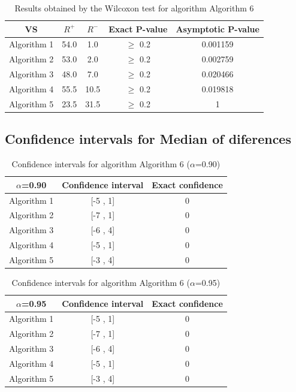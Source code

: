 \documentclass[a4paper,10pt]{article}
\begin{document}
\begin{table}[!htp]
\centering\small
\begin{tabular}{
|c|c|c|c|c|}
\hline
 VS & $R^{+}$ & $R^{-}$ & Exact P-value & Asymptotic P-value \\ \hline 
Algorithm 1 & 54.0 & 1.0 & $\geq$ 0.2 & 0.001159\\ \hline 
Algorithm 2 & 53.0 & 2.0 & $\geq$ 0.2 & 0.002759\\ \hline 
Algorithm 3 & 48.0 & 7.0 & $\geq$ 0.2 & 0.020466\\ \hline 
Algorithm 4 & 55.5 & 10.5 & $\geq$ 0.2 & 0.019818\\ \hline 
Algorithm 5 & 23.5 & 31.5 & $\geq$ 0.2 & 1\\ \hline 

\end{tabular}
\caption{Results obtained by the Wilcoxon test for algorithm Algorithm 6}
\end{table}

\subsection{Confidence intervals for Median of diferences}

\begin{table}[!htp]
\centering\small
\begin{tabular}{
|c|c|c|}
\hline
 $\alpha$=0.90 & Confidence interval & Exact confidence \\ \hline 
Algorithm 1 & [-5 , 1] & 0\\ \hline 
Algorithm 2 & [-7 , 1] & 0\\ \hline 
Algorithm 3 & [-6 , 4] & 0\\ \hline 
Algorithm 4 & [-5 , 1] & 0\\ \hline 
Algorithm 5 & [-3 , 4] & 0\\ \hline 

\end{tabular}
\caption{Confidence intervals for algorithm Algorithm 6 ($\alpha$=0.90)}
\end{table}
\begin{table}[!htp]
\centering\small
\begin{tabular}{
|c|c|c|}
\hline
 $\alpha$=0.95 & Confidence interval & Exact confidence \\ \hline 
Algorithm 1 & [-5 , 1] & 0\\ \hline 
Algorithm 2 & [-7 , 1] & 0\\ \hline 
Algorithm 3 & [-6 , 4] & 0\\ \hline 
Algorithm 4 & [-5 , 1] & 0\\ \hline 
Algorithm 5 & [-3 , 4] & 0\\ \hline 

\end{tabular}
\caption{Confidence intervals for algorithm Algorithm 6 ($\alpha$=0.95)}
\end{table}

 \clearpage 
\end{document}
